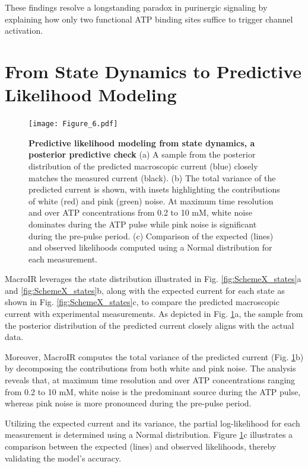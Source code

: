 \documentclass[pdflatex,sn-nature]{sn-jnl}%
\begin{document}
These findings resolve a longstanding paradox in purinergic signaling by explaining how only two functional ATP binding sites suffice to trigger channel activation.


\section{From State Dynamics to Predictive Likelihood Modeling}
\label{sec:likelihood}

\begin{figure}[t]
	\centering
	\texttt{[image: Figure\_6.pdf]}
	\caption{\textbf{Predictive likelihood modeling from state dynamics, a posterior predictive check} (a) A sample from the posterior distribution of the predicted macroscopic current (blue) closely matches the measured current (black). (b) The total variance of the predicted current is shown, with insets highlighting the contributions of white (red) and pink (green) noise. At maximum time resolution and over ATP concentrations from 0.2 to 10 mM, white noise dominates during the ATP pulse while pink noise is significant during the pre-pulse period. (c) Comparison of the expected (lines) and observed likelihoods computed using a Normal distribution for each measurement.}
	\label{fig:SchemeX_likelihood}
\end{figure}

MacroIR leverages the state distribution illustrated in Fig. \ref{fig:SchemeX_states}a and \ref{fig:SchemeX_states}b, along with the expected current for each state as shown in Fig. \ref{fig:SchemeX_states}c, to compare the predicted macroscopic current with experimental measurements. As depicted in Fig. \ref{fig:SchemeX_likelihood}a, the sample from the posterior distribution of the predicted current closely aligns with the actual data. 

Moreover, MacroIR computes the total variance of the predicted current (Fig. \ref{fig:SchemeX_likelihood}b) by decomposing the contributions from both white and pink noise. The analysis reveals that, at maximum time resolution and over ATP concentrations ranging from 0.2 to 10 mM, white noise is the predominant source during the ATP pulse, whereas pink noise is more pronounced during the pre-pulse period.

Utilizing the expected current and its variance, the partial log-likelihood for each measurement is determined using a Normal distribution. Figure \ref{fig:SchemeX_likelihood}c illustrates a comparison between the expected (lines) and observed likelihoods, thereby validating the model's accuracy.
\end{document}
